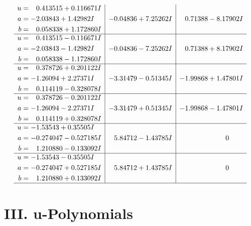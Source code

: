 \documentclass[1p]{elsarticle_modified}
\theoremstyle{definition}
\begin{document}
$$\begin{array}{c|c|c}
\begin{aligned}
u &= \phantom{-}0.413515 + 0.116671 I \\
a &= -2.03843 + 1.42982 I \\
b &= \phantom{-}0.058338 + 1.172860 I\end{aligned}
 & -0.04836 + 7.25262 I & \phantom{-}0.71388 - 8.17902 I \\ \hline\begin{aligned}
u &= \phantom{-}0.413515 - 0.116671 I \\
a &= -2.03843 - 1.42982 I \\
b &= \phantom{-}0.058338 - 1.172860 I\end{aligned}
 & -0.04836 - 7.25262 I & \phantom{-}0.71388 + 8.17902 I \\ \hline\begin{aligned}
u &= \phantom{-}0.378726 + 0.201122 I \\
a &= -1.26094 + 2.27371 I \\
b &= \phantom{-}0.114119 - 0.328078 I\end{aligned}
 & -3.31479 - 0.51345 I & -1.99868 + 1.47801 I \\ \hline\begin{aligned}
u &= \phantom{-}0.378726 - 0.201122 I \\
a &= -1.26094 - 2.27371 I \\
b &= \phantom{-}0.114119 + 0.328078 I\end{aligned}
 & -3.31479 + 0.51345 I & -1.99868 - 1.47801 I \\ \hline\begin{aligned}
u &= -1.53543 + 0.35505 I \\
a &= -0.274047 - 0.527185 I \\
b &= \phantom{-}1.210880 - 0.133092 I\end{aligned}
 & \phantom{-}5.84712 - 1.43785 I & \phantom{-0.000000 } 0 \\ \hline\begin{aligned}
u &= -1.53543 - 0.35505 I \\
a &= -0.274047 + 0.527185 I \\
b &= \phantom{-}1.210880 + 0.133092 I\end{aligned}
 & \phantom{-}5.84712 + 1.43785 I & \phantom{-0.000000 } 0\\
 \hline 
 \end{array}$$\newpage
\newpage\renewcommand{\arraystretch}{1}
\centering \section*{ III. u-Polynomials}
\end{document}
